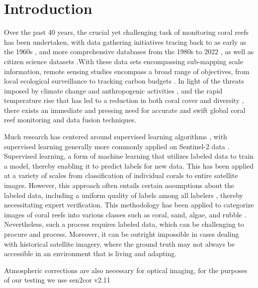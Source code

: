 \documentclass[journal,article,submit,pdftex,moreauthors]{Definitions/mdpi}
\begin{document}

\section{Introduction}

Over the past 40 years, the crucial yet challenging task of monitoring coral reefs has been undertaken, with data gathering initiatives tracing back to as early as the 1960s \cite{goreau1964mass}, and more comprehensive databases from the 1980s to 2022 \cite{Woesik2022},  as well as
citizen science datasets \cite{ALA2021}.With these data sets encompassing sub-mapping scale information, remote sensing studies encompass a broad range of objectives, from local ecological surveillance to tracking carbon budgets \cite{duarte2017reviews}. In light of the threats imposed 
by climate change and anthropogenic activities \cite{hughes2010rising}, 
and the rapid temperature rise that has led to a reduction in both coral cover and diversity \cite{bruno2007thermal} \cite{pandolfi2003global} \cite{hoegh2007coral}, there exists an immediate and pressing need for accurate and swift global coral reef monitoring and data fusion techniques.


Much research has centered around supervised learning algorithms \cite{su14106161} \cite{white2021coral} \cite{pavoni2022taglab} \cite{zeng2022spectral}, with supervised learning generally more commonly applied on Sentinel-2 data \cite{phiri2020sentinel}. 
Supervised learning, a form of machine learning that utilizes labeled data to train a model, thereby enabling it to predict labels for new data.
This has been applied at a variety of scales from classification of individual corals to entire satellite images. However, this approach often entails certain assumptions about the labeled data, including a uniform quality of labels among all labelers \cite{sheng2008get}, 
thereby necessitating expert verification. This methodology has been applied to categorize images of coral reefs into various classes such as coral, sand, algae, and rubble \cite{Li2020}. 
Nevertheless, such a process requires labeled data, which can be challenging to procure and process. Moreover, it can be outright impossible in cases dealing with historical satellite imagery, where the ground truth may not always be accessible in an environment that is living and adapting.

Atmospheric corrections are also necessary for optical imaging, for the purposes of our testing we use sen2cor v2.11
\end{document}
